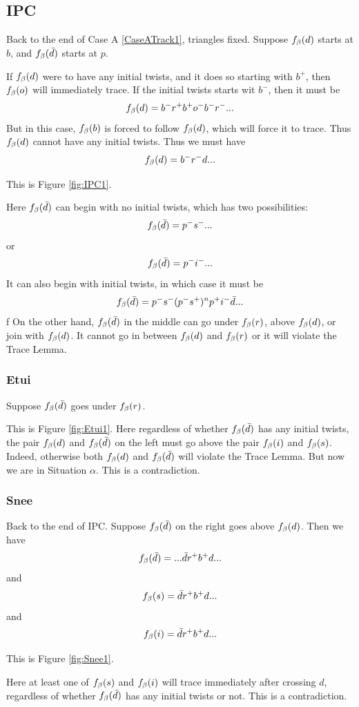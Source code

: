 \subsection{IPC}\label{IPC}
Back to the end of Case A \ref{CaseATrack1}, triangles fixed. Suppose $f_\beta(d)$ starts at $b$, and $f_\beta(\bar{d})$ starts at $p$.

If $f_\beta(d)$ were to have any initial twists, and it does so starting with $b^+$, then $f_\beta(o)$ will immediately trace. If the initial twists starts wit $b^-$, then it must be
\[
f_\beta(d) = b^- r^+ b^+ o^- b^- r^-...
\]
But in this case, $f_\beta(b)$ is forced to follow $f_\beta(d)$, which will force it to trace. Thus $f_\beta(d)$ cannot have any initial twists. Thus we must have
\[
f_\beta(d) = b^- r^- d...
\]

This is Figure \ref{fig:IPC1}.

Here $f_\beta(\bar{d})$ can begin with no initial twists, which has two possibilities:
\[
f_\beta(\bar{d}) = p^- s^-...
\]
or 
\[
f_\beta(\bar{d}) = p^- i^-...
\]
It can also begin with initial twists, in which case it must be
\[
f_\beta(\bar{d}) = p^- s^- (p^-s^+)^n p^+ i^- \bar{d}...
\]
f
On the other hand, $f_\beta(\bar{d})$ in the middle can go under $f_\beta(r)$, above $f_\beta(d)$, or join with $f_\beta(d)$. It cannot go in between $f_\beta(d)$ and $f_\beta(r)$ or it will violate the Trace Lemma.

\subsubsection{Etui}\label{Etui}
Suppose $f_\beta(\bar{d})$ goes under $f_\beta(r)$. 

This is Figure \ref{fig:Etui1}. Here regardless of whether $f_\beta(\bar{d})$ has any initial twists, the pair $f_\beta(d)$ and $f_\beta(\bar{d})$ on the left must go above the pair $f_\beta(i)$ and $f_\beta(s)$. Indeed, otherwise both $f_\beta(d)$ and $f_\beta(\bar{d})$ will violate the Trace Lemma. But now we are in Situation $\alpha$. This is a contradiction.

\subsubsection{Snee}\label{Snee}
Back to the end of IPC. Suppose $f_\beta(\bar{d})$ on the right goes above $f_\beta(d)$. Then we have
\[
f_\beta(\bar{d}) = ...\bar{d} r^+ b^+ d...
\]
and 
\[
f_\beta(s) = \bar{d} r^+ b^+ d...
\]
and 
\[
f_\beta(i) = \bar{d} r^+ b^+ d...
\]

This is Figure \ref{fig:Snee1}.

Here at least one of $f_\beta(s)$ and $f_\beta(i)$ will trace immediately after crossing $d$, regardless of whether $f_\beta(\bar{d})$ has any initial twists or not. This is a contradiction.

